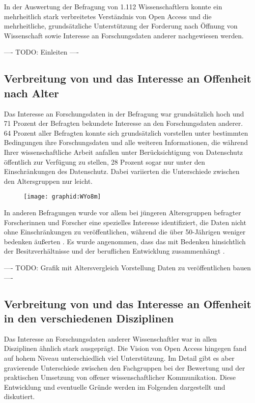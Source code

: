 In der Auswertung der Befragung von 1.112 Wissenschaftlern konnte ein mehrheitlich stark verbreitetes Verständnis von Open Access und die mehrheitliche, grundsätzliche Unterstützung der Forderung nach Öffnung von Wissenschaft sowie Interesse an Forschungsdaten anderer nachgewiesen werden.

---- TODO: Einleiten ----

\subsection{Verbreitung von und das Interesse an Offenheit nach Alter}

Das Interesse an Forschungsdaten in der Befragung war grundsätzlich hoch und 71 Prozent der Befragten bekundete Interesse an den Forschungsdaten anderer. 64 Prozent aller Befragten konnte sich grundsätzlich vorstellen unter bestimmten Bedingungen ihre Forschungsdaten und alle weiteren Informationen, die während Ihrer wissenschaftliche Arbeit anfallen unter Berücksichtigung von Datenschutz öffentlich zur Verfügung zu stellen, 28 Prozent sogar nur unter den Einschränkungen des Datenschutz. Dabei variierten die Unterschiede zwischen den Altersgruppen nur leicht.

\begin{figure}[h!]
\texttt{[image: graphid:WYo8m]}
\end{figure}

In anderen Befragungen wurde vor allem bei jüngeren Altersgruppen befragter Forscherinnen und Forscher eine spezielles Interesse identifiziert, die Daten nicht ohne Einschränkungen zu veröffentlichen, während die über 50-Jährigen weniger bedenken äußerten \cite{Tenopir_2011}. Es wurde angenommen, dass das mit Bedenken hinsichtlich der Besitzverhältnisse und der beruflichen Entwicklung zusammenhängt \cite{Tenopir_2011}.

---- TODO: Grafik mit Altersvergleich Vorstellung Daten zu veröffentlichen bauen  ----

\subsection{Verbreitung von und das Interesse an Offenheit in den verschiedenen Disziplinen}

Das Interesse an Forschungsdaten anderer Wissenschaftler war in allen Disziplinen ähnlich stark ausgeprägt. Die Vision von Open Access hingegen fand auf hohem Niveau unterschiedlich viel Unterstützung. Im Detail gibt es aber gravierende Unterschiede zwischen den Fachgruppen bei der Bewertung und der praktischen Umsetzung von offener wissenschaftlicher Kommunikation. Diese Entwicklung und eventuelle Gründe werden im Folgenden dargestellt und diskutiert.

